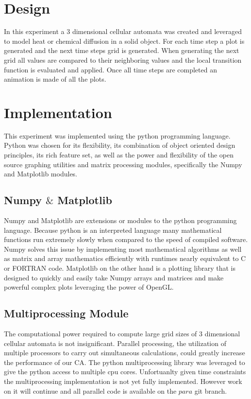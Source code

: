 \documentclass[11pt,twocolumn]{article}
\begin{document}
\section{Design}
In this experiment a 3 dimensional cellular automata was created and leveraged to model heat or chemical diffusion in a solid object. 
For each time step a plot is generated and the next time steps grid is generated. When generating the next grid all values 
are compared to their neighboring values and the local transition function is evaluated and applied. Once all time steps are completed an animation is made of all the plots.
\section{Implementation} 
This experiment was implemented using the python programming language. 
Python was chosen for its flexibility, its combination of object oriented design principles, its rich feature set, 
as well as the power and flexibility of the open source graphing utilities and matrix processing modules, 
specifically the Numpy and Matplotlib modules.

\subsection{Numpy $\&$ Matplotlib }
Numpy and Matplotlib are extensions or modules to the python programming language. Because python is an interpreted language 
many mathematical functions run extremely slowly when compared to the speed of compiled software. 
Numpy solves this issue by implementing most mathematical algorithms as well as matrix and array mathematics efficiently with runtimes nearly equivalent to C or FORTRAN code.\cite{mplot} 
Matplotlib on the other hand is a plotting library that is designed to quickly and easily take Numpy arrays and matrices and make powerful complex plots leveraging the power of OpenGL.\cite{numpy} 

\subsection{Multiprocessing Module}
The computational power required to compute large grid sizes of 3 dimensional cellular automata is not insignificant. Parallel processing, the utilization of multiple processors to carry out simultaneous calculations, could greatly increase the performance of our CA. The python multiprocessing library was leveraged to give the python access to multiple cpu cores. Unfortuanlty given time constraints the multiprocessing implementation is not yet fully implemented. However work on it will continue and all parallel code is available on the $para$ git branch.
\end{document}
